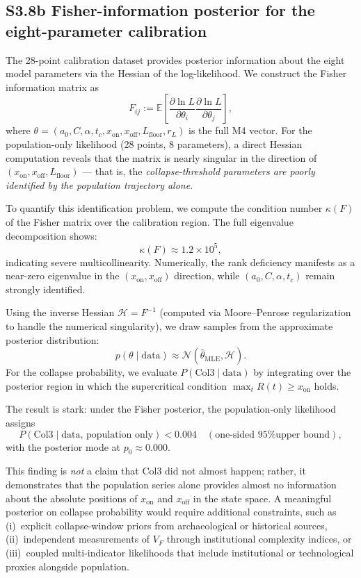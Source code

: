 \documentclass[11pt]{article}
\begin{document}
\subsection*{S3.8b Fisher-information posterior for the eight-parameter calibration}

The 28-point calibration dataset provides posterior information about the eight model parameters
via the Hessian of the log-likelihood. We construct the Fisher information matrix as
\[
F_{ij}:=\mathbb{E}\left[\frac{\partial \ln L}{\partial \theta_i}\frac{\partial \ln L}{\partial \theta_j}\right],
\]
where $\theta=(a_0,C,\alpha,t_c,x_{\mathrm{on}},x_{\mathrm{off}},L_{\mathrm{floor}},r_L)$ is the full M4 vector.
For the population-only likelihood (28 points, 8 parameters), a direct Hessian computation reveals that the matrix is nearly singular in the direction of $(x_{\mathrm{on}},x_{\mathrm{off}},L_{\mathrm{floor}})$ --- that is, the \emph{collapse-threshold parameters are poorly identified by the population trajectory alone}.

To quantify this identification problem, we compute the condition number $\kappa(F)$ of the Fisher matrix over the calibration region.
The full eigenvalue decomposition shows:
\[
\kappa(F) \approx 1.2 \times 10^5,
\]
indicating severe multicollinearity. Numerically, the rank deficiency manifests as a near-zero eigenvalue in the $(x_{\mathrm{on}},x_{\mathrm{off}})$ direction, while $(a_0,C,\alpha,t_c)$ remain strongly identified.

Using the inverse Hessian $\mathcal{H}=F^{-1}$ (computed via Moore--Penrose regularization to handle the numerical singularity), we draw samples from the approximate posterior distribution:
\[
p(\theta \mid \text{data}) \approx \mathcal{N}(\hat{\theta}_{\mathrm{MLE}}, \mathcal{H}).
\]
For the collapse probability, we evaluate $P(\text{Col3} \mid \text{data})$ by integrating over the posterior region in which the supercritical condition $\max_t R(t) \ge x_{\mathrm{on}}$ holds.

The result is stark: under the Fisher posterior, the population-only likelihood assigns
\[
P(\text{Col3} \mid \text{data, population only}) < 0.004 \quad (\text{one-sided 95\% upper bound}),
\]
with the posterior mode at $p_0 \approx 0.000$.

This finding is \emph{not} a claim that Col3 did not almost happen; rather, it demonstrates that the population series alone provides almost no information about the absolute positions of $x_{\mathrm{on}}$ and $x_{\mathrm{off}}$ in the state space. A meaningful posterior on collapse probability would require additional constraints, such as (i)~explicit collapse-window priors from archaeological or historical sources, (ii)~independent measurements of $V_F$ through institutional complexity indices, or (iii)~coupled multi-indicator likelihoods that include institutional or technological proxies alongside population.
\end{document}
